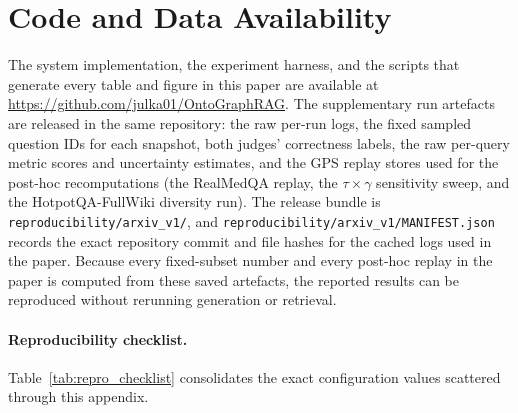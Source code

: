 \section{Code and Data Availability}
\label{sec:appendix_code}

The system implementation, the experiment harness, and the scripts that
generate every table and figure in this paper are available at
\url{https://github.com/julka01/OntoGraphRAG}.
The supplementary run artefacts are released in the same repository: the raw
per-run logs, the fixed sampled question IDs for each snapshot, both judges'
correctness labels, the raw per-query metric scores and uncertainty estimates,
and the GPS replay stores used for the post-hoc recomputations (the RealMedQA
replay, the $\tau\times\gamma$ sensitivity sweep, and the HotpotQA-FullWiki
diversity run).
The release bundle is \texttt{reproducibility/arxiv\_v1/}, and
\texttt{reproducibility/arxiv\_v1/MANIFEST.json} records the exact repository
commit and file hashes for the cached logs used in the paper.
Because every fixed-subset number and every post-hoc replay in the paper is
computed from these saved artefacts, the reported results can be reproduced
without rerunning generation or retrieval.

\paragraph{Reproducibility checklist.}
Table~\ref{tab:repro_checklist} consolidates the exact configuration values
scattered through this appendix.


